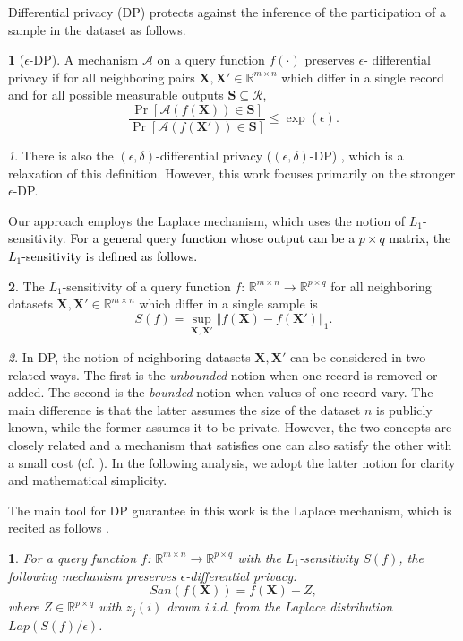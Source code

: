 \documentclass[USenglish,oneside,twocolumn]{article}
\theoremstyle{definition}
\newtheorem{defn}{\protect\definitionname}
\theoremstyle{remark}
\newtheorem{rem}{\protect\remarkname}
\theoremstyle{plain}
\newtheorem{thm}{\protect\theoremname}
\theoremstyle{plain}
\providecommand{\definitionname}{Definition}
\providecommand{\remarkname}{Remark}
\providecommand{\theoremname}{Theorem}
\newcommand{\chang}{\textcolor{black}}
\begin{document}
Differential privacy (DP) protects against the inference of the participation
of a sample in the dataset as follows.
\begin{defn}[$\epsilon$-DP]
\label{def:differential_privacy}A mechanism $\mathcal{A}$ on a query
function $f(\cdot)$ preserves $\epsilon$- differential privacy if
for all neighboring pairs $\mathbf{X},\mathbf{X}'\in\mathbb{R}^{m\times n}$
which differ in a single record and for all possible measurable outputs
$\mathbf{S}\subseteq\mathcal{R}$, 
\[
\frac{\Pr[\mathcal{A}(f(\mathbf{X}))\in\mathbf{S}]}{\Pr[\mathcal{A}(f(\mathbf{X}'))\in\mathbf{S}]}\leq\exp(\epsilon).
\]
\end{defn}
\begin{rem}
\label{rem:eps-delt-DP}There is also the $(\epsilon,\delta)$-differential
privacy ($(\epsilon,\delta)$-DP) \cite{RefWorks:186,RefWorks:259}, which is a relaxation of
this definition. However, this work focuses primarily on
the stronger $\epsilon$-DP.
\end{rem}
Our approach employs the Laplace mechanism, which uses the
notion of $L_{1}$-sensitivity. \chang{For a general query function whose output can be a $p\times q$ matrix, the $L_{1}$-sensitivity is defined as follows.}
\begin{defn}
The $L_{1}$-sensitivity of a query function $f$: $\mathbb{R}^{m\times n}\rightarrow\mathbb{R}^{p\times q}$
for all neighboring datasets $\mathbf{X},\mathbf{X}'\in\mathbb{R}^{m\times n}$
which differ in a single sample is 
\[
S(f)=\sup_{\mathbf{X},\mathbf{X}'}\left\Vert f(\mathbf{X})-f(\mathbf{X}')\right\Vert _{1}.
\]
\end{defn}
\begin{rem}
\label{rem:neighboring_notion}In DP, the notion of neighboring datasets
$\mathbf{X},\mathbf{X}'$ can be considered in two related ways. The
first is the \emph{unbounded} notion when one record is removed or
added. The second is the \emph{bounded} notion when values of one
record vary. The main difference is that the latter assumes the size
of the dataset $n$ is publicly known, while the former assumes it
to be private. However, the two concepts are closely related and a
mechanism that satisfies one can also satisfy the other with a small
cost (cf. \cite{RefWorks:174}). In the following analysis, we adopt
the latter notion for clarity and mathematical simplicity.
\end{rem}
The main tool for DP guarantee in this work is the Laplace mechanism,
which is recited as follows \cite{RefWorks:195,RefWorks:220}.
\begin{thm}
\label{thm:laplace_matrix}For a query function $f$: $\mathbb{R}^{m\times n}\rightarrow\mathbb{R}^{p\times q}$
with the $L_{1}$-sensitivity $S(f)$, the following mechanism preserves
$\epsilon$-differential privacy: 
\[
San(f(\mathbf{X}))=f(\mathbf{X})+Z,
\]
where $Z\in\mathbb{R}^{p\times q}$ with $z_{j}(i)$ drawn i.i.d.
from the Laplace distribution $Lap(S(f)/\epsilon)$. 
\end{thm}
\end{document}
